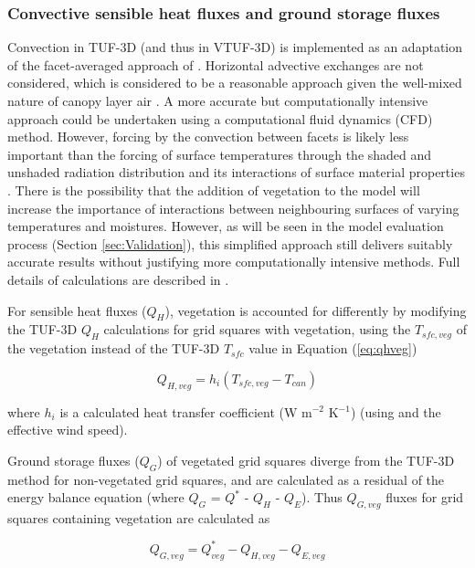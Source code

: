 \documentclass[final,3p,times,authoryear]{elsarticle}
\begin{document}
\subsubsection{Convective sensible heat fluxes and ground storage fluxes}\label{sec:convection} 
Convection in TUF-3D (and thus in VTUF-3D) is implemented as an adaptation of the facet-averaged approach of \cite{Masson2000}. Horizontal advective exchanges are not considered, which is considered to be a reasonable approach given the well-mixed nature of canopy layer air \citep{Krayenhoff2007}. A more accurate but computationally intensive approach could be undertaken using a computational fluid dynamics (CFD) method. However, forcing by the convection between facets is likely less important than the forcing of surface temperatures through the shaded and unshaded radiation distribution and its interactions of surface material properties \citep{Krayenhoff2007}. There is the possibility that the addition of vegetation to the model will increase the importance of interactions between neighbouring surfaces of varying temperatures and moistures. However, as will be seen in the model evaluation process (Section \ref{sec:Validation}), this simplified approach still delivers suitably accurate results without justifying more computationally intensive methods. Full details of calculations are described in \cite{Krayenhoff2007}.

For sensible heat fluxes ($Q_{H}$), vegetation is accounted for differently by modifying the TUF-3D $Q_{H}$ calculations for grid squares with vegetation, using the $T_{sfc,veg}$ of the vegetation instead of the TUF-3D $T_{sfc}$ value in Equation (\ref{eq:qhveg})

\begin{equation}\label{eq:qhveg}
 Q_{H,veg} = h_{i}  (T_{sfc,veg}-T_{can}) 
\end{equation}

where $h_{i}$ is a calculated heat transfer coefficient (W m$^{-2}$ K$^{-1}$) (using \cite{Mascart1995} and the effective wind speed). 


Ground storage fluxes ($Q_{G}$) of vegetated grid squares diverge from the TUF-3D method for non-vegetated grid squares, and are calculated as a residual of the energy balance equation (where $Q_{G}$ = $Q^{*}$ - $Q_{H}$ - $Q_{E}$). Thus $Q_{G,veg}$ fluxes for grid squares containing vegetation are calculated as

\begin{equation}\label{eq:qgvtuf}
 Q_{G,veg} =  Q^{*}_{veg} - Q_{H,veg} - Q_{E,veg}
\end{equation}
\end{document}
